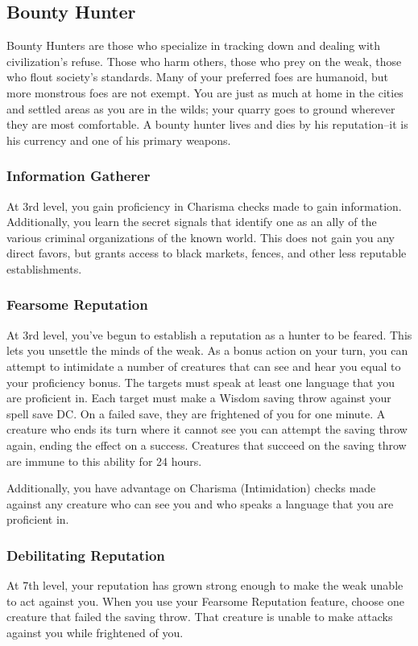\subsection{Bounty Hunter}
Bounty Hunters are those who specialize in tracking down and dealing with civilization's refuse. Those who harm others, those who prey on the weak, those who flout society's standards. Many of your preferred foes are humanoid, but more monstrous foes are not exempt. You are just as much at home in the cities and settled areas as you are in the wilds; your quarry goes to ground wherever they are most comfortable. A bounty hunter lives and dies by his reputation--it is his currency and one of his primary weapons.

\subsubsection{Information Gatherer}
At 3rd level, you gain proficiency in Charisma checks made to gain information. Additionally, you learn the secret signals that identify one as an ally of the various criminal organizations of the known world. This does not gain you any direct favors, but grants access to black markets, fences, and other less reputable establishments.

\subsubsection{Fearsome Reputation}
At 3rd level, you've begun to establish a reputation as a hunter to be feared. This lets you unsettle the minds of the weak. As a bonus action on your turn, you can attempt to intimidate a number of creatures that can see and hear you equal to your proficiency bonus. The targets must speak at least one language that you are proficient in. Each target must make a Wisdom saving throw against your spell save DC. On a failed save, they are frightened of you for one minute. A creature who ends its turn where it cannot see you can attempt the saving throw again, ending the effect on a success. Creatures that succeed on the saving throw are immune to this ability for 24 hours.

Additionally, you have advantage on Charisma (Intimidation) checks made against any creature who can see you and who speaks a language that you are proficient in.

\subsubsection{Debilitating Reputation}
At 7th level, your reputation has grown strong enough to make the weak unable to act against you. When you use your Fearsome Reputation feature, choose one creature that failed the saving throw. That creature is unable to make attacks against you while frightened of you.

